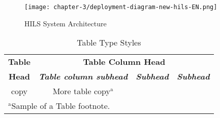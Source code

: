 \begin{figure}[htbp]
	\centerline{\texttt{[image: chapter-3/deployment-diagram-new-hils-EN.png]}}
	\caption{HILS System Architecture}
	\label{section-3-hils-deployment-diagram}
\end{figure}

\begin{table}[htbp]
	\caption{Table Type Styles}
	\label{tab1}
	\begin{center}
		\begin{tabular}{c c c c}
			\toprule
			\textbf{Table} & \multicolumn{3}{|c|}{\textbf{Table Column Head}}                                                         \\
			\cline{2-4}
			\textbf{Head}  & \textbf{\textit{Table column subhead}}           & \textbf{\textit{Subhead}} & \textbf{\textit{Subhead}} \\
			\midrule
			copy           & More table copy$^{\mathrm{a}}$                   &                           &                           \\
			\bottomrule
			\multicolumn{4}{l}{$^{\mathrm{a}}$Sample of a Table footnote.}
		\end{tabular}
	\end{center}
\end{table}